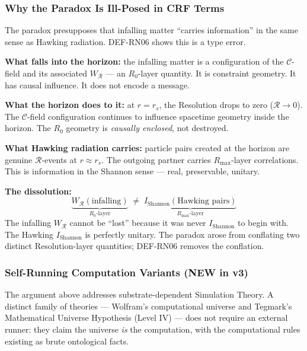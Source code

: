 \documentclass[12pt, a4paper]{article}
\begin{document}
\subsubsection{Why the Paradox Is Ill-Posed in CRF Terms}

The paradox presupposes that infalling matter ``carries information''
in the same sense as Hawking radiation. DEF-RN06 shows this is a
type error.

\begin{keybox}[title={CRF's Resolution of the Information Paradox}]
\textbf{What falls into the horizon:} the infalling matter is a
configuration of the $\mathcal{C}$-field and its associated
$W_{\mathcal{R}}$ --- an $R_0$-layer quantity. It is constraint
geometry. It has causal influence. It does not encode a message.

\medskip
\textbf{What the horizon does to it:} at $r = r_s$, the Resolution
drops to zero ($\mathcal{R} \to 0$). The $\mathcal{C}$-field
configuration continues to influence spacetime geometry inside the
horizon. The $R_0$ geometry is \emph{causally enclosed},
not destroyed.

\medskip
\textbf{What Hawking radiation carries:} particle pairs created at
the horizon are genuine $\mathcal{R}$-events at $r \approx r_s$.
The outgoing partner carries $R_{\max}$-layer correlations.
This is information in the Shannon sense --- real, preservable,
unitary.

\medskip
\textbf{The dissolution:}
\[
  \underbrace{W_{\mathcal{R}}(\text{infalling})}_{R_0\text{-layer}}
  \;\neq\;
  \underbrace{I_{\mathrm{Shannon}}(\text{Hawking pairs})}_{R_{\max}\text{-layer}}
\]
The infalling $W_{\mathcal{R}}$ cannot be ``lost'' because it was
never $I_{\mathrm{Shannon}}$ to begin with. The Hawking
$I_{\mathrm{Shannon}}$ is perfectly unitary. The paradox arose
from conflating two distinct Resolution-layer quantities; DEF-RN06
removes the conflation.
\end{keybox}

\subsubsection{Self-Running Computation Variants (NEW in v3)}
\label{sec:wolfram}

The argument above addresses substrate-dependent Simulation Theory.
A distinct family of theories --- Wolfram's computational universe
and Tegmark's Mathematical Universe Hypothesis (Level IV) ---
does not require an external runner: they claim the universe
\emph{is} the computation, with the computational rules existing
as brute ontological facts.
\end{document}
